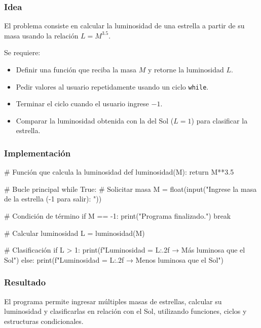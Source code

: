 \begin{solution}

\subsubsection*{Idea}
El problema consiste en calcular la luminosidad de una estrella a partir de su masa usando la relación \(L = M^{3.5}\). 

Se requiere:
\begin{itemize}
    \item Definir una función que reciba la masa \(M\) y retorne la luminosidad \(L\).
    \item Pedir valores al usuario repetidamente usando un ciclo \texttt{while}.
    \item Terminar el ciclo cuando el usuario ingrese \(-1\).
    \item Comparar la luminosidad obtenida con la del Sol (\(L=1\)) para clasificar la estrella.
\end{itemize}

\subsubsection*{Implementación}

\begin{pythonjupyter}
# Función que calcula la luminosidad
def luminosidad(M):
    return M**3.5

# Bucle principal
while True:
    # Solicitar masa
    M = float(input("Ingrese la masa de la estrella (-1 para salir): "))
    
    # Condición de término
    if M == -1:
        print("Programa finalizado.")
        break
    
    # Calcular luminosidad
    L = luminosidad(M)
    
    # Clasificación
    if L > 1:
        print(f"Luminosidad = {L:.2f} → Más luminosa que el Sol")
    else:
        print(f"Luminosidad = {L:.2f} → Menos luminosa que el Sol")
\end{pythonjupyter}

\subsubsection*{Resultado}
El programa permite ingresar múltiples masas de estrellas, calcular su luminosidad y clasificarlas en relación con el Sol, utilizando funciones, ciclos y estructuras condicionales.

\end{solution}
